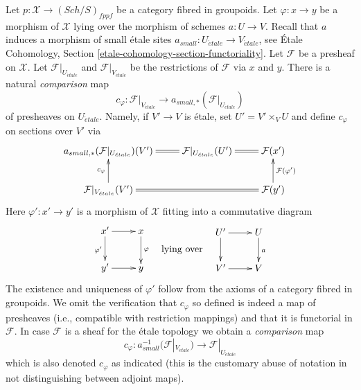 \documentclass{stacks-project}
\theoremstyle{plain}
\theoremstyle{definition}
\theoremstyle{remark}
\numberwithin{equation}{subsection}
\def\Sch{\mathit{Sch}}
\def\etale{{\acute{e}tale}}
\begin{document}
\medskip\noindent
Let $p : \mathcal{X} \to (\Sch/S)_{fppf}$ be a category fibred
in groupoids. Let $\varphi : x \to y$ be a morphism of $\mathcal{X}$
lying over the morphism of schemes $a : U \to V$.
Recall that $a$ induces a morphism of small \'etale
sites $a_{small} : U_\etale \to V_\etale$, see
\'Etale Cohomology, Section \ref{etale-cohomology-section-functoriality}.
Let $\mathcal{F}$ be a presheaf on $\mathcal{X}$.
Let $\mathcal{F}|_{U_\etale}$ and
$\mathcal{F}|_{V_\etale}$ be the restrictions of $\mathcal{F}$
via $x$ and $y$. There is a natural {\it comparison} map
\begin{equation}
\label{equation-comparison-push}
c_\varphi :
\mathcal{F}|_{V_\etale}
\longrightarrow
a_{small, *}(\mathcal{F}|_{U_\etale})
\end{equation}
of presheaves on $U_\etale$. Namely, if $V' \to V$ is \'etale,
set $U' = V' \times_V U$ and define $c_\varphi$ on sections over $V'$
via
$$
\xymatrix{
a_{small, *}(\mathcal{F}|_{U_\etale})(V') &
\mathcal{F}|_{U_\etale}(U') \ar@{=}[l] &
\mathcal{F}(x') \ar@{=}[l] \\
\mathcal{F}|_{V_\etale}(V') \ar@{=}[rr] \ar[u]^{c_\varphi} &
&
\mathcal{F}(y') \ar[u]_{\mathcal{F}(\varphi')}
}
$$
Here $\varphi' : x' \to y'$ is a morphism of $\mathcal{X}$
fitting into a commutative diagram
$$
\vcenter{
\xymatrix{
x' \ar[r] \ar[d]_{\varphi'} & x \ar[d]^\varphi \\
y' \ar[r] & y
}
}
\quad\text{lying over}\quad
\vcenter{
\xymatrix{
U' \ar[r] \ar[d] & U \ar[d]^a \\
V' \ar[r] & V
}
}
$$
The existence and uniqueness of $\varphi'$ follow from the axioms
of a category fibred in groupoids.
We omit the verification that $c_\varphi$ so defined is indeed a map
of presheaves (i.e., compatible with restriction mappings) and that
it is functorial in $\mathcal{F}$. In case $\mathcal{F}$ is a sheaf for the
\'etale topology we obtain a {\it comparison} map
\begin{equation}
\label{equation-comparison}
c_\varphi : a_{small}^{-1}(\mathcal{F}|_{V_\etale})
\longrightarrow
\mathcal{F}|_{U_\etale}
\end{equation}
which is also denoted $c_\varphi$ as indicated (this is the customary abuse
of notation in not distinguishing between adjoint maps).
\end{document}
